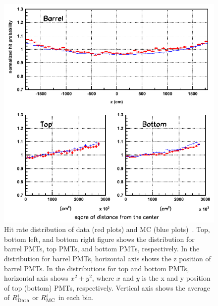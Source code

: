 \begin{figure}[h]
	\centering
	\includegraphics[width=12cm]{Figures/Calibration/Hitrate}
	\caption[Hit rate distribution of data and MC]{
	Hit rate distribution of data (red plots) and MC (blue plots)~\cite{2014AbeCalib}.
	Top, bottom left, and bottom right figure shows the distribution for barrel PMTs, top PMTs, and bottom PMTs, respectively.
	In the distribution for barrel PMTs, horizontal axis shows the z position of barrel PMTs.
	In the distributions for top and bottom PMTs, horizontal axis shows $x^{2} + y^{2}$, where $x$ and $y$ is the x and y position of top (bottom) PMTs, respectively.
	Vertical axis shows the average of $R_{\rm Data}^{i}$ or $R_{\rm MC}^{i}$ in each bin.
	}\label{Calibration_Hitrate}
\end{figure}

